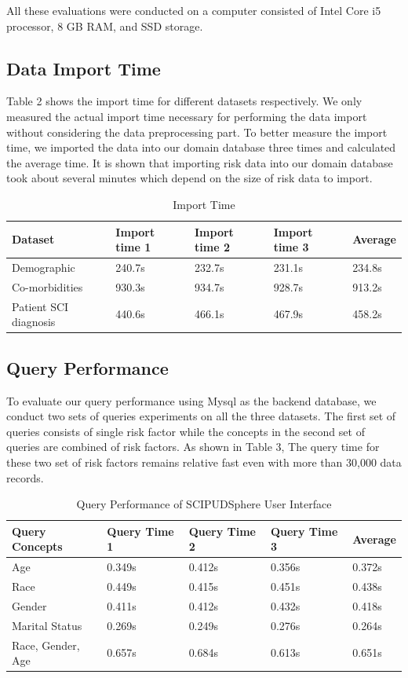 \documentclass{amia}
\begin{document}
All these evaluations were conducted on a computer consisted of Intel Core i5 processor, 8 GB RAM, and SSD storage.

\subsection{Data Import Time}

Table 2 shows the import time for different datasets respectively. We only measured the actual import time necessary for performing the data import without considering the data preprocessing part. To better measure the import time, we imported the data into our domain database three times and calculated the average time. It is shown that importing risk data into our domain database took about several minutes which depend on the size of risk data to import.

\begin{table}[!ht]
\centering
\caption{Import Time}
  \begin{tabular}{|l|l|l|l|l|}
  \hline
    \textbf{Dataset}  & \textbf{Import time 1} & \textbf{Import time 2} & \textbf{Import time 3} & \textbf{Average} \\ \hline
    Demographic & 240.7s & 232.7s & 231.1s & 234.8s  \\ \hline
    Co-morbidities  & 930.3s & 934.7s & 928.7s & 913.2s  \\ \hline
    Patient SCI diagnosis  & 440.6s & 466.1s & 467.9s & 458.2s \\ \hline
  \end{tabular}
\end{table}

\subsection{Query Performance}
To evaluate our query performance using Mysql as the backend database, we conduct two sets of queries experiments on all the three datasets. The first set of queries consists of single risk factor while the concepts in the second set of queries are combined of risk factors. As shown in Table 3, The query time for these two set of risk factors remains relative fast even with more than 30,000 data records. 

\begin{table}[!ht]
\centering
\caption{Query Performance of SCIPUDSphere User Interface}
  \begin{tabular}{|l|l|l|l|l|}
  \hline
    \textbf{Query Concepts}  & \textbf{Query Time 1} & \textbf{Query Time 2} & \textbf{Query Time 3} & \textbf{Average} \\ \hline
    Age & 0.349s & 0.412s & 0.356s & 0.372s \\ \hline
    Race & 0.449s & 0.415s & 0.451s & 0.438s \\ \hline
    Gender   & 0.411s & 0.412s & 0.432s & 0.418s \\ \hline
    Marital Status   & 0.269s & 0.249s & 0.276s & 0.264s \\ \hline
    Race, Gender, Age & 0.657s & 0.684s & 0.613s & 0.651s \\ \hline
  \end{tabular}
\end{table}
\end{document}
